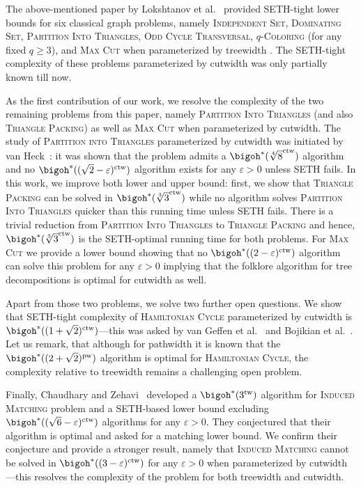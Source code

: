 \documentclass[a4paper,UKenglish,cleveref, autoref, thm-restate]{lipics-v2021}
\begin{document}
The above-mentioned paper by Lokshtanov et al.~\cite{DBLP:journals/talg/LokshtanovMS18} provided SETH-tight lower bounds for six classical graph problems, namely \textsc{Independent Set}, \textsc{Dominating Set}, \textsc{Partition Into Triangles}, \textsc{Odd Cycle Transversal}, \textsc{$q$-Coloring} (for any fixed $q \geq 3$), and \textsc{Max Cut} when parameterized by treewidth \cite{DBLP:journals/talg/LokshtanovMS18}.
The SETH-tight complexity of these problems parameterized by cutwidth was only partially known till now. 

As the first contribution of our work, we resolve the complexity of the two remaining problems from this paper, namely \textsc{Partition Into Triangles} (and also \textsc{Triangle Packing}) as well as \textsc{Max Cut} when parameterized by cutwidth.
The study of \textsc{Partition into Triangles} parameterized by cutwidth was initiated by van Heck~\cite{thesisTrianglePacking}: it was shown that the problem admits a $\bigoh^*(\sqrt[4]{8}^{\operatorname{ctw}})$ algorithm and no $\bigoh^*((\sqrt{2} - \varepsilon)^{\operatorname{ctw}})$ algorithm exists for any $\varepsilon > 0$ unless SETH fails.
In this work, we improve both lower and upper bound: first, we show that \textsc{Triangle Packing} can be solved in $\bigoh^*(\sqrt[3]{3}^{\operatorname{ctw}})$ while no algorithm solves \textsc{Partition Into Triangles} quicker than this running time unless SETH fails.
There is a trivial reduction from \textsc{Partition Into Triangles} to \textsc{Triangle Packing} and hence, $\bigoh^*(\sqrt[3]{3}^{\operatorname{ctw}})$ is the SETH-optimal running time for both problems.
For \textsc{Max Cut} we provide a lower bound showing that no $\bigoh^*((2-\varepsilon)^{\operatorname{ctw}})$ algorithm can solve this problem for any $\varepsilon > 0$ implying that the folklore algorithm for tree decompositions is optimal for cutwidth as well.

Apart from those two problems, we solve two further open questions.
We show that SETH-tight complexity of \textsc{Hamiltonian Cycle} parameterized by cutwidth is $\bigoh^*((1+\sqrt{2})^{\operatorname{ctw}})$---this was asked by van Geffen et al.~\cite{DBLP:journals/jgaa/GeffenJKM20} and Bojikian et al.~\cite{DBLP:conf/stacs/BojikianCHK23}.
Let us remark, that although for pathwidth it is known that the $\bigoh^*((2+\sqrt{2})^{\operatorname{pw}})$ algorithm is optimal for \textsc{Hamiltonian Cycle}, the complexity relative to treewidth remains a challenging open problem.

Finally, Chaudhary and Zehavi~\cite{DBLP:conf/wg/ChaudharyZ23a} developed a $\bigoh^*(3^{\operatorname{tw}})$ algorithm for \textsc{Induced Matching} problem and a SETH-based lower bound excluding $\bigoh^*((\sqrt{6} - \varepsilon)^{\operatorname{ctw}})$ algorithms for any $\varepsilon > 0$.
They conjectured that their algorithm is optimal and asked for a matching lower bound.
We confirm their conjecture and provide a stronger result, namely that \textsc{Induced Matching} cannot be solved in $\bigoh^*((3 - \varepsilon)^{\operatorname{ctw}})$ for any $\varepsilon > 0$ when parameterized by cutwidth---this resolves the complexity of the problem for both treewidth and cutwidth.  
\end{document}
